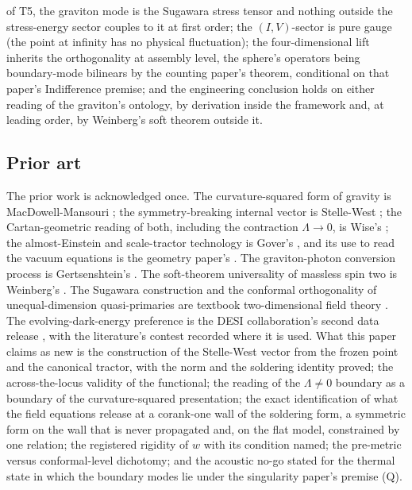 \documentclass[11pt]{article}
\theoremstyle{definition}
\theoremstyle{plain}
\begin{document}
of T5, the graviton mode is the Sugawara stress tensor and nothing outside the stress-energy sector couples to it at first order; the $(I,V)$-sector is pure gauge (the point at infinity has no physical fluctuation); the four-dimensional lift inherits the orthogonality at assembly level, the sphere's operators being boundary-mode bilinears by the counting paper's theorem, conditional on that paper's Indifference premise; and the engineering conclusion holds on either reading of the graviton's ontology, by derivation inside the framework and, at leading order, by Weinberg's soft theorem outside it.

\subsection*{Prior art}
\label{c:note.dark-energy.setting-prior-art}
The prior work is acknowledged once. The curvature-squared form of gravity is MacDowell-Mansouri \cite{MacDowellMansouri1977}; the symmetry-breaking internal vector is Stelle-West \cite{StelleWest1980}; the Cartan-geometric reading of both, including the contraction $\Lambda \to 0$, is Wise's \cite{Wise2010}; the almost-Einstein and scale-tractor technology is Gover's \cite{Gover2010}, and its use to read the vacuum equations is the geometry paper's \cite{ButlerT6}. The graviton-photon conversion process is Gertsenshtein's \cite{Gertsenshtein1962}. The soft-theorem universality of massless spin two is Weinberg's \cite{Weinberg1964}. The Sugawara construction and the conformal orthogonality of unequal-dimension quasi-primaries are textbook two-dimensional field theory \cite{DiFrancesco1997}. The evolving-dark-energy preference is the DESI collaboration's second data release \cite{DESI2025}, with the literature's contest recorded where it is used. What this paper claims as new is the construction of the Stelle-West vector from the frozen point and the canonical tractor, with the norm and the soldering identity proved; the across-the-locus validity of the functional; the reading of the $\Lambda \neq 0$ boundary as a boundary of the curvature-squared presentation; the exact identification of what the field equations release at a corank-one wall of the soldering form, a symmetric form on the wall that is never propagated and, on the flat model, constrained by one relation; the registered rigidity of $w$ with its condition named; the pre-metric versus conformal-level dichotomy; and the acoustic no-go stated for the thermal state in which the boundary modes lie under the singularity paper's premise (Q).
\end{document}

